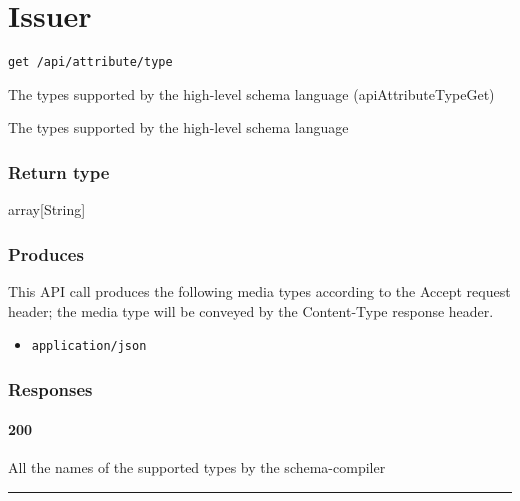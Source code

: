 \hypertarget{issuer-1}{%
\section{\texorpdfstring{\protect\hypertarget{Issuer}{}{Issuer}}{Issuer}}\label{issuer-1}}

\protect\hypertarget{apiAttributeTypeGet}{}{}

\begin{verbatim}
get /api/attribute/type
\end{verbatim}

The types supported by the high-level schema language
({apiAttributeTypeGet})

The types supported by the high-level schema language

\hypertarget{return-type-37}{%
\subsubsection{Return type}\label{return-type-37}}

array{[}String{]}

\hypertarget{produces-46}{%
\subsubsection{Produces}\label{produces-46}}

This API call produces the following media types according to the
{Accept} request header; the media type will be conveyed by the
{Content-Type} response header.

\begin{itemize}
\tightlist
\item
  \texttt{application/json}
\end{itemize}

\hypertarget{responses-46}{%
\subsubsection{Responses}\label{responses-46}}

\hypertarget{section-154}{%
\paragraph{200}\label{section-154}}

All the names of the supported types by the schema-compiler

\begin{center}\rule{0.5\linewidth}{\linethickness}\end{center}

